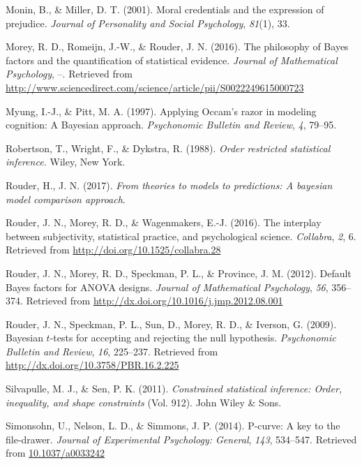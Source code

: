 \documentclass[english,man]{apa6}
\theoremstyle{definition}
\theoremstyle{definition}
\theoremstyle{remark}
\begin{document}
\hypertarget{ref-Monin:Miller:2001}{}
Monin, B., \& Miller, D. T. (2001). Moral credentials and the expression
of prejudice. \emph{Journal of Personality and Social Psychology},
\emph{81}(1), 33.

\hypertarget{ref-Morey:etal:2016}{}
Morey, R. D., Romeijn, J.-W., \& Rouder, J. N. (2016). The philosophy of
Bayes factors and the quantification of statistical evidence.
\emph{Journal of Mathematical Psychology}, --. Retrieved from
\url{http://www.sciencedirect.com/science/article/pii/S0022249615000723}

\hypertarget{ref-Myung:Pitt:1997}{}
Myung, I.-J., \& Pitt, M. A. (1997). Applying Occam's razor in modeling
cognition: A Bayesian approach. \emph{Psychonomic Bulletin and Review},
\emph{4}, 79--95.

\hypertarget{ref-Robertson:etal:1988}{}
Robertson, T., Wright, F., \& Dykstra, R. (1988). \emph{Order restricted
statistical inference.} Wiley, New York.

\hypertarget{ref-Rouder:etal:2017}{}
Rouder, H., J. N. (2017). \emph{From theories to models to predictions:
A bayesian model comparison approach}.

\hypertarget{ref-Rouder:etal:2016b}{}
Rouder, J. N., Morey, R. D., \& Wagenmakers, E.-J. (2016). The interplay
between subjectivity, statistical practice, and psychological science.
\emph{Collabra}, \emph{2}, 6. Retrieved from
\url{http://doi.org/10.1525/collabra.28}

\hypertarget{ref-Rouder:etal:2012}{}
Rouder, J. N., Morey, R. D., Speckman, P. L., \& Province, J. M. (2012).
Default Bayes factors for ANOVA designs. \emph{Journal of Mathematical
Psychology}, \emph{56}, 356--374. Retrieved from
\url{http://dx.doi.org/10.1016/j.jmp.2012.08.001}

\hypertarget{ref-Rouder:etal:2009a}{}
Rouder, J. N., Speckman, P. L., Sun, D., Morey, R. D., \& Iverson, G.
(2009). Bayesian \(t\)-tests for accepting and rejecting the null
hypothesis. \emph{Psychonomic Bulletin and Review}, \emph{16}, 225--237.
Retrieved from \url{http://dx.doi.org/10.3758/PBR.16.2.225}

\hypertarget{ref-Silvapulle:Senn:2011}{}
Silvapulle, M. J., \& Sen, P. K. (2011). \emph{Constrained statistical
inference: Order, inequality, and shape constraints} (Vol. 912). John
Wiley \& Sons.

\hypertarget{ref-Simonsohn:etal:2014}{}
Simonsohn, U., Nelson, L. D., \& Simmons, J. P. (2014). P-curve: A key
to the file-drawer. \emph{Journal of Experimental Psychology: General},
\emph{143}, 534--547. Retrieved from \url{10.1037/a0033242}
\end{document}
